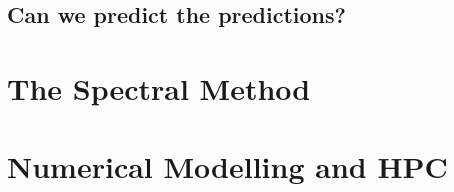 \documentclass[11pt,fleqn]{book} %
\begin{document}
	\section{Can we predict the predictions?}
	
	\vspace{1em}
		
\newpage	


\newpage	


\newpage	


\newpage	


\newpage	
{} %
\chapter{The Spectral Method}	

\chapter{Numerical Modelling and HPC}	
	
	\vspace{1em} 

\newpage	

\end{document}

